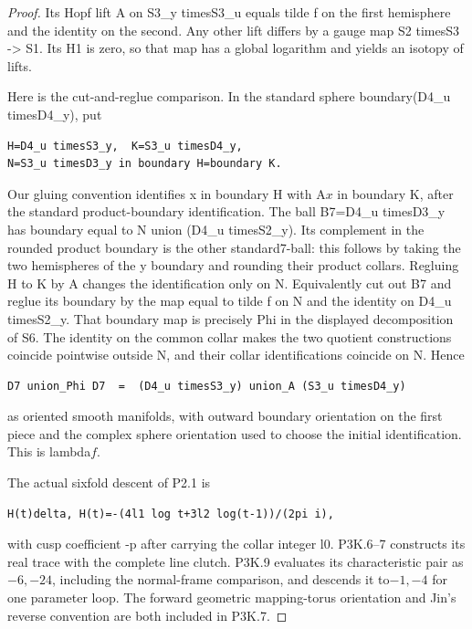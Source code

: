 \begin{proof}
Its Hopf lift A on S3\_y timesS3\_u equals tilde f on the first hemisphere and the identity on the second. Any other lift differs by a gauge map S2 timesS3 -\textgreater{} S1. Its H1 is zero, so that map has a global logarithm and yields an isotopy of lifts.

Here is the cut-and-reglue comparison. In the standard sphere boundary(D4\_u timesD4\_y), put

\begin{lstlisting}
H=D4_u timesS3_y,  K=S3_u timesD4_y,
N=S3_u timesD3_y in boundary H=boundary K.
\end{lstlisting}

Our gluing convention identifies x in boundary H with A\(x\) in boundary K, after the standard product-boundary identification. The ball B7=D4\_u timesD3\_y has boundary equal to N union (D4\_u timesS2\_y). Its complement in the rounded product boundary is the other standard7-ball: this follows by taking the two hemispheres of the y boundary and rounding their product collars. Regluing H to K by A changes the identification only on N. Equivalently cut out B7 and reglue its boundary by the map equal to tilde f on N and the identity on D4\_u timesS2\_y. That boundary map is precisely Phi in the displayed decomposition of S6. The identity on the common collar makes the two quotient constructions coincide pointwise outside N, and their collar identifications coincide on N. Hence

\begin{lstlisting}
D7 union_Phi D7  =  (D4_u timesS3_y) union_A (S3_u timesD4_y)
\end{lstlisting}

as oriented smooth manifolds, with outward boundary orientation on the first piece and the complex sphere orientation used to choose the initial identification. This is lambda\(f\).

The actual sixfold descent of P2.1 is

\begin{lstlisting}
H(t)delta, H(t)=-(4l1 log t+3l2 log(t-1))/(2pi i),
\end{lstlisting}

with cusp coefficient -p after carrying the collar integer l0. P3K.6--7 constructs its real trace with the complete line clutch. P3K.9 evaluates its characteristic pair as\(-6,-24\), including the normal-frame comparison, and descends it to\(-1,-4\) for one parameter loop. The forward geometric mapping-torus orientation and Jin's reverse convention are both included in P3K.7.
\end{proof}
